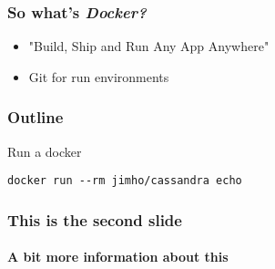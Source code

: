 \documentclass{beamer}
\begin{document}
    \begin{frame}\frametitle{So what's \em{Docker}?}
        \begin{itemize}
            \item "Build, Ship and Run Any App Anywhere"
            \item Git for run environments
        \end{itemize}
    \end{frame}
    \begin{frame}\frametitle{Outline}
        \tableofcontents

    \end{frame}

    \begin{frame}[fragile=singleslide]
        \begin{block}{Run a docker}
        \begin{verbatim}
docker run --rm jimho/cassandra echo
        \end{verbatim}
        \end{block}
    \end{frame}

    \begin{frame}\frametitle{This is the second slide}
    \framesubtitle{A bit more information about this}

    \end{frame}
\end{document}
